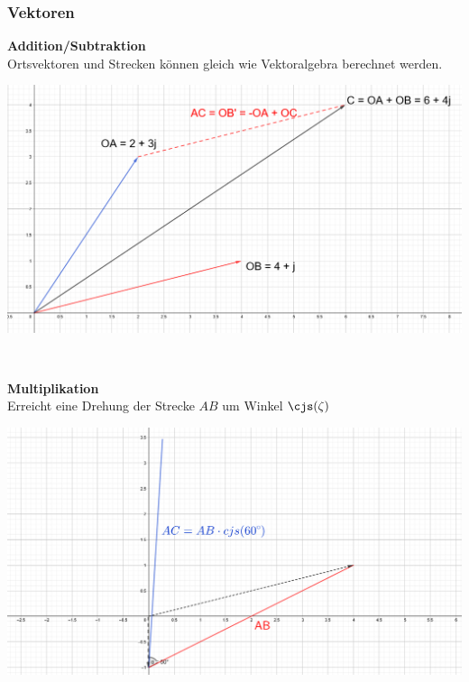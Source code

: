 \subsubsection{Vektoren}
\begin{minipage}{\textwidth}		
	\begin{minipage}{0.2\textwidth}
		\textbf{Addition/Subtraktion}\\
		Ortsvektoren und Strecken können gleich wie Vektoralgebra berechnet werden.
	\end{minipage}%
	\begin{minipage}{0.3\textwidth}
		\includegraphics[width=\columnwidth]{Images/vec_addition}
	\end{minipage}
\end{minipage}
~\\
\begin{minipage}{\textwidth}		
	\begin{minipage}{0.2\textwidth}
		\textbf{Multiplikation}\\
		Erreicht eine Drehung der Strecke $AB$ um Winkel $\cjs(\zeta)$
	\end{minipage}%
	\begin{minipage}{0.3\textwidth}
		\includegraphics[width=\columnwidth]{Images/vec_multiplikation}
	\end{minipage}
\end{minipage}
